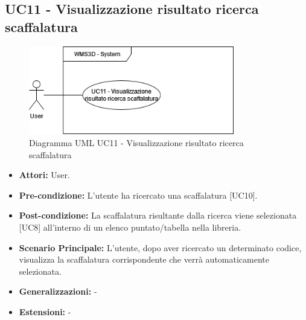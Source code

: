 \subsection{UC11 - Visualizzazione risultato ricerca scaffalatura}
\begin{figure}[H]
  \centering
  \includegraphics[width=0.8\textwidth]{UC_diagrams_11-20/UC11.drawio.png}
   \caption{Diagramma UML UC11 - Visualizzazione risultato ricerca scaffalatura}
\end{figure}
\begin{itemize}
    \item \textbf{Attori:} User.
    \item \textbf{Pre-condizione:} L'utente ha ricercato una scaffalatura [UC10].
    \item \textbf{Post-condizione:} La scaffalatura risultante dalla ricerca viene selezionata [UC8] all'interno di un elenco puntato/tabella nella libreria.
    \item \textbf{Scenario Principale:} L'utente, dopo aver ricercato un determinato codice, visualizza la scaffalatura corrispondente che verrà automaticamente selezionata.
    \item \textbf{Generalizzazioni:} -
    \item \textbf{Estensioni:} -
\end{itemize}